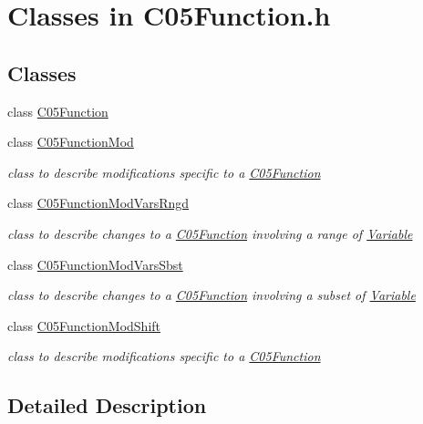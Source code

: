 \hypertarget{group___c05_function___c_l_a_s_s_e_s}{}\section{Classes in C05\+Function.\+h}
\label{group___c05_function___c_l_a_s_s_e_s}
\subsection*{Classes}
\begin{DoxyCompactItemize}
\item 
class \mbox{\hyperlink{class_s_m_spp__di__unipi__it_1_1_c05_function}{C05\+Function}}
\item 
class \mbox{\hyperlink{class_s_m_spp__di__unipi__it_1_1_c05_function_mod}{C05\+Function\+Mod}}
\begin{DoxyCompactList}\small\item\em class to describe modifications specific to a \mbox{\hyperlink{class_s_m_spp__di__unipi__it_1_1_c05_function}{C05\+Function}} \end{DoxyCompactList}\item 
class \mbox{\hyperlink{class_s_m_spp__di__unipi__it_1_1_c05_function_mod_vars_rngd}{C05\+Function\+Mod\+Vars\+Rngd}}
\begin{DoxyCompactList}\small\item\em class to describe changes to a \mbox{\hyperlink{class_s_m_spp__di__unipi__it_1_1_c05_function}{C05\+Function}} involving a range of \mbox{\hyperlink{class_s_m_spp__di__unipi__it_1_1_variable}{Variable}} \end{DoxyCompactList}\item 
class \mbox{\hyperlink{class_s_m_spp__di__unipi__it_1_1_c05_function_mod_vars_sbst}{C05\+Function\+Mod\+Vars\+Sbst}}
\begin{DoxyCompactList}\small\item\em class to describe changes to a \mbox{\hyperlink{class_s_m_spp__di__unipi__it_1_1_c05_function}{C05\+Function}} involving a subset of \mbox{\hyperlink{class_s_m_spp__di__unipi__it_1_1_variable}{Variable}} \end{DoxyCompactList}\item 
class \mbox{\hyperlink{class_s_m_spp__di__unipi__it_1_1_c05_function_mod_shift}{C05\+Function\+Mod\+Shift}}
\begin{DoxyCompactList}\small\item\em class to describe modifications specific to a \mbox{\hyperlink{class_s_m_spp__di__unipi__it_1_1_c05_function}{C05\+Function}} \end{DoxyCompactList}\end{DoxyCompactItemize}


\subsection{Detailed Description}
